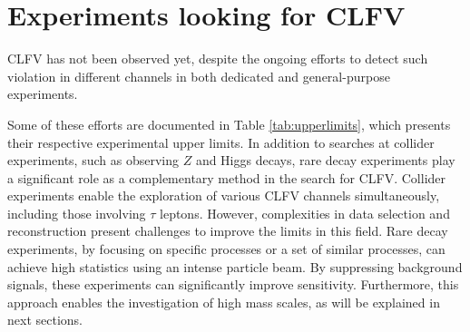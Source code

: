 \section{Experiments looking for CLFV}
CLFV has not been observed yet, despite the ongoing efforts to 
detect such violation in different channels in both dedicated and general-purpose experiments.

Some of these efforts are documented in Table \ref{tab:upperlimits}, which 
presents their respective experimental upper limits. 
In addition to searches at collider experiments, such as observing $Z$ and 
Higgs decays, rare decay experiments play a significant role as a complementary method in the search for CLFV. 
Collider experiments enable the exploration of various CLFV channels simultaneously, 
including those involving $\tau$ leptons. 
However, complexities in data selection and reconstruction 
present challenges to improve the limits in this field.
Rare decay experiments, by focusing on specific processes or a 
set of similar processes, can achieve high statistics using an intense particle beam. 
By suppressing background signals, these experiments can 
significantly improve sensitivity. Furthermore, this approach 
enables the investigation of high mass scales, as will be explained in next sections.

